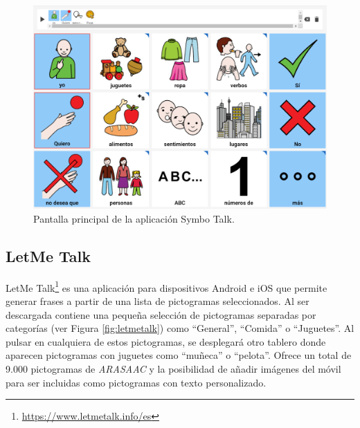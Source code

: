 \begin{figure}[h!]
	\centering
	\includegraphics[width=0.7\linewidth]{Imagenes/Bitmap/SymboTalk}
	\caption{Pantalla principal de la aplicación Symbo Talk.}
	\label{fig:symbotalk}
\end{figure}

\newpage
\subsection{LetMe Talk}

LetMe Talk\footnote{\url{ https://www.letmetalk.info/es}} es una aplicación para dispositivos Android e iOS que permite generar frases a partir de una lista de  pictogramas seleccionados. Al ser descargada contiene una pequeña selección de pictogramas separadas por categorías (ver Figura \ref{fig:letmetalk}) como “General”, “Comida” o “Juguetes”. Al pulsar en cualquiera de estos pictogramas, se desplegará otro tablero donde aparecen pictogramas con juguetes como “muñeca” o “pelota”. 
Ofrece un total de 9.000 pictogramas de \textit{ARASAAC} y la posibilidad de añadir imágenes del móvil para ser incluidas como pictogramas con texto personalizado. 


